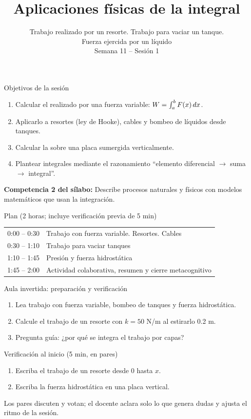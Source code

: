 \documentclass[10pt,aspectratio=169]{beamer}
\title[Trabajo y fuerza hidrostática]{Aplicaciones físicas de la integral}
\subtitle{Trabajo realizado por un resorte. Trabajo para vaciar un tanque.\\Fuerza ejercida por un líquido\\[2pt]\small Semana 11 -- Sesión 1}
\begin{document}
\begin{frame}
  \titlepage
\end{frame}

\begin{frame}{Objetivos de la sesión}
  \begin{enumerate}
    \item Calcular el  realizado por una fuerza variable: $W=\int_a^bF(x)\,dx$.
    \item Aplicarlo a resortes (ley de Hooke), cables y bombeo de líquidos desde tanques.
    \item Calcular la  sobre una placa sumergida verticalmente.
    \item Plantear integrales mediante el razonamiento ``elemento diferencial $\to$ suma $\to$ integral''.
  \end{enumerate}
  \vspace{1mm}
  {\small\textbf{Competencia 2 del sílabo:} Describe procesos naturales y físicos con modelos matemáticos que usan la integración.}
  \begin{block}{Plan (2 horas; incluye verificación previa de 5 min)}
    \begin{tabular}{ll}
      0:00 -- 0:30 & Trabajo con fuerza variable. Resortes. Cables\\
      0:30 -- 1:10 & Trabajo para vaciar tanques\\
      1:10 -- 1:45 & Presión y fuerza hidrostática\\
      1:45 -- 2:00 & Actividad colaborativa, resumen y cierre metacognitivo
    \end{tabular}
  \end{block}
\end{frame}

\begin{frame}{Aula invertida: preparación y verificación}
  \small
  \begin{previa}
    \begin{enumerate}
      \item Lea trabajo con fuerza variable, bombeo de tanques y fuerza hidrostática.
      \item Calcule el trabajo de un resorte con $k=50$ N/m al estirarlo 0.2 m.
      \item Pregunta guía: ¿por qué se integra el trabajo por capas?
    \end{enumerate}
  \end{previa}
  \begin{block}{Verificación al inicio (5 min, en pares)}
    \begin{enumerate}
      \item Escriba el trabajo de un resorte desde $0$ hasta $x$.
      \item Escriba la fuerza hidrostática en una placa vertical.
    \end{enumerate}
    Los pares discuten y votan; el docente aclara solo lo que genera dudas y ajusta el ritmo de la sesión.
  \end{block}
\end{frame}
\end{document}
